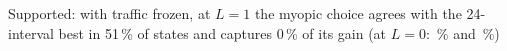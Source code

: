 Supported: with traffic frozen, at $L=1$ the myopic choice agrees with the 24-interval best in 51\,\% of states and captures 0\,\% of its gain (at $L=0$: \SeqFrozenAgreeHTwentyFour\,\% and \SeqFrozenCapturedHTwentyFour\,\%)